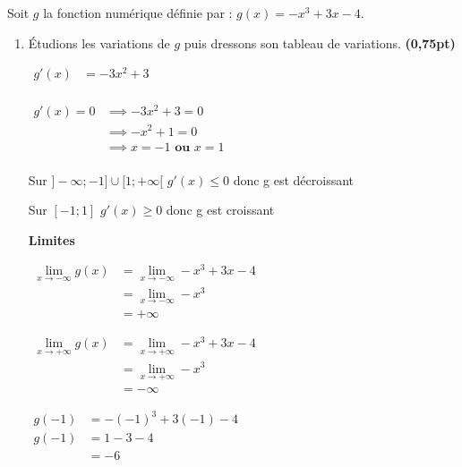\documentclass[12pt,a4paper]{article}
\begin{document}
Soit $g$ la fonction numérique définie par : $g(x) = -x^3 + 3x - 4$.

\begin{enumerate}
    \item Étudions les variations de $g$ puis dressons son tableau de variations. \textbf{(0,75pt)}

        $
        \begin{aligned}
        g'(x) &= -3x^2 + 3\\ 
        \end{aligned}
        $    

         $
        \begin{aligned}
        g'(x) = 0  &\implies -3x^2 + 3 = 0\\ 
                   &\implies -x^2 + 1 = 0\\
                   &\implies x=-1 \textbf{ ou } x=1\\
        \end{aligned}
        $    


Sur $]-\infty ; -1] \cup [1;+\infty[$ $g'(x) \leq 0$ donc g est décroissant

Sur $[-1 ; 1]$ $g'(x) \geq 0$ donc g est croissant

\textbf{Limites}

$
\begin{aligned}
\lim\limits_{x \to -\infty}g(x)&=\lim\limits_{x \to -\infty}-x^3 + 3x - 4\\
                               &=\lim\limits_{x \to -\infty}-x^3\\
                               &=+\infty										
\end{aligned}
$

$
\begin{aligned}
\lim\limits_{x \to +\infty}g(x)&=\lim\limits_{x \to +\infty}-x^3 + 3x - 4\\
                               &=\lim\limits_{x \to +\infty}-x^3\\
                               &=-\infty										
\end{aligned}
$

$
\begin{aligned}
g(-1) &= -(-1)^3 + 3(-1) - 4\\
g(-1) &= 1 -3 - 4\\
      &=-6							
\end{aligned}
$


\end{enumerate}
\end{document}
